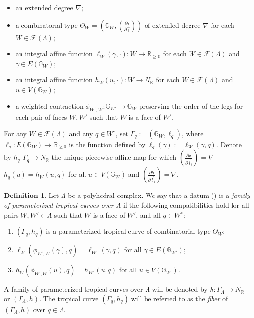 \documentclass[11pt,reqno]{amsart}
\numberwithin{equation}{section}
\theoremstyle{definition}
\newtheorem{defn}[thm]{Definition}
\newcommand{\RR}{{\mathbb R}}
\newcommand{\GG}{{\mathbb G}}
\def\:{\colon}
\theoremstyle{remark}
\begin{document}
\begin{itemize}
\item an extended degree $\overline\nabla$;
\item a combinatorial type $\Theta_W=\left(\GG_W,\left(\frac{\partial h}{\partial\vec\gamma}\right)\right)$ of extended degree $\overline\nabla$ for each $W \in \mathcal F(\Lambda)$;
\item an integral affine function $\ell_W(\gamma,\cdot)\:W\to \RR_{\ge 0}$ for each $W \in \mathcal F(\Lambda)$ and $\gamma\in E(\GG_W)$;
\item an integral affine function $h_W (u,\cdot):W\to N_\RR$ for each $W \in \mathcal F(\Lambda)$ and $u\in V(\GG_W)$;
\item a weighted contraction $\phi_{W',W}\: \mathbb{G}_{W'} \to \mathbb{G}_W$ preserving the order of the legs for each pair of faces $W,W'$ such that $W$ is a face of $W'$.
\end{itemize}
For any $W \in \mathcal F(\Lambda)$ and any $q\in W^\circ$, set $\Gamma_q:=(\mathbb{G}_W, \ell_q)$, where $\ell_q\:E(\GG_W)\to \RR_{\ge 0}$ is the function defined by $\ell_q(\gamma):=\ell_W(\gamma,q)$. Denote by $h_q\colon \Gamma_q\rightarrow N_\mathbb R$ the unique piecewise affine map for which $\left(\frac{\partial h}{\partial \vec l_i}\right)=\overline\nabla$$h_q(u)=h_W(u,q)$ for all $u\in V(\GG_W)$ and $\left(\frac{\partial h}{\partial \vec l_i}\right)=\overline\nabla$.

\begin{defn}\label{defn:family of tropical curves}
    Let $\Lambda$ be a polyhedral complex. We say that a datum (\dag) is a {\em family of parameterized tropical curves over $\Lambda$} if the following compatibilities hold for all pairs $W,W' \in\Lambda$ such that $W$ is a face of $W'$, and all $q\in W^\circ$:
\begin{enumerate}
\item $(\Gamma_q,h_q)$ is a parameterized tropical curve of combinatorial type $\Theta_W$;
\item  $\ell_W(\phi_{W',W}(\gamma),q)=\ell_{W'}(\gamma,q)$ for all $\gamma\in E(\GG_{W'})$;
\item $h_W(\phi_{W',W}(u),q)=h_{W'}(u,q)$ for all $u\in V(\GG_{W'})$.
\end{enumerate}
A family of parameterized tropical curves over $\Lambda$ will be denoted by $h\:\Gamma_\Lambda\to N_\RR$ or $(\Gamma_\Lambda,h)$. The tropical curve $(\Gamma_q,h_q)$ will be referred to as the \textit{fiber} of $(\Gamma_\Lambda,h)$ over $q\in \Lambda$.
\end{defn}
\end{document}
